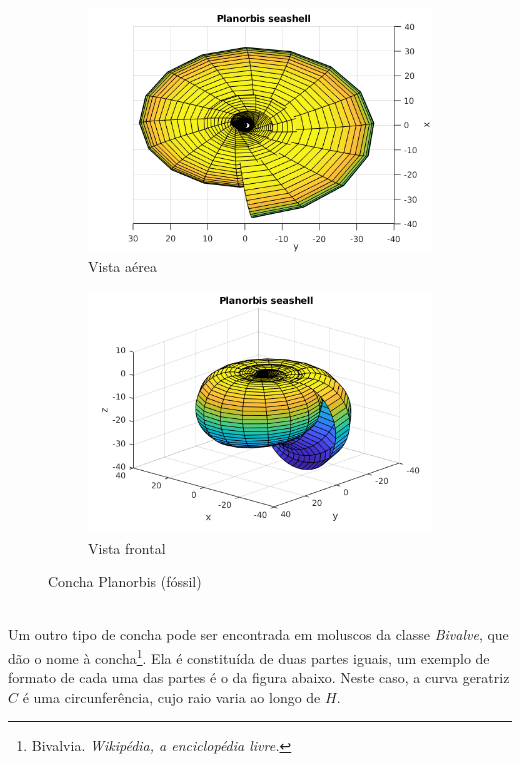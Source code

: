 \documentclass[a4paper]{article}
\begin{document}
\begin{figure}[h!]
\centering
\begin{subfigure}{.5\textwidth}
  \centering
  \includegraphics[width=.9\textwidth]{planorbis_up.png}
  \caption{Vista aérea}
  \label{planorbis_up}
\end{subfigure}%
\begin{subfigure}{.5\textwidth}
  \centering
  \includegraphics[width=.9\textwidth]{planorbis_front.png}
  \caption{Vista frontal}
  \label{fig:sub2}
\end{subfigure}
\caption{Concha Planorbis (fóssil)}
\label{planorbis_front}
\end{figure}


\hfill \\

Um outro tipo de concha pode ser encontrada em moluscos da classe \textit{Bivalve}, que dão o nome à concha\footnote{Bivalvia. \textit{Wikipédia, a enciclopédia livre.}}. Ela é constituída de duas partes iguais, um exemplo de formato de cada uma das partes é o da figura abaixo. Neste caso, a curva geratriz $C$ é uma circunferência, cujo raio varia ao longo de $H$.
\end{document}
